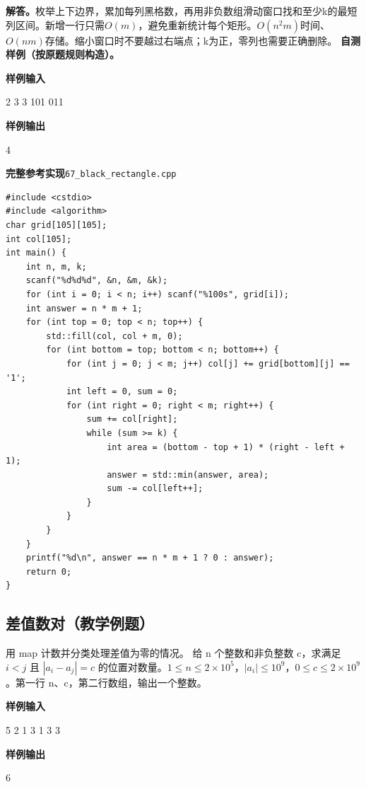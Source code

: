 \documentclass[UTF8,11pt,a4paper,fontset=none]{ctexart}
\begin{document}
\noindent\textbf{解答。}枚举上下边界，累加每列黑格数，再用非负数组滑动窗口找和至少k的最短列区间。新增一行只需$O(m)$，避免重新统计每个矩形。$O(n^2m)$时间、$O(nm)$存储。缩小窗口时不要越过右端点；k为正，零列也需要正确删除。
\textbf{自测样例（按原题规则构造）。}
\begin{tcolorbox}[samplebox,title={输入输出样例}]
\textbf{样例输入}
\begin{Sample}
2 3 3
101
011
\end{Sample}
\tcblower
\textbf{样例输出}
\begin{Sample}
4
\end{Sample}
\end{tcolorbox}
\par\noindent\begin{minipage}{\linewidth}
\textbf{完整参考实现}\quad\texttt{67\_black\_rectangle.cpp}
\begin{lstlisting}
#include <cstdio>
#include <algorithm>
char grid[105][105];
int col[105];
int main() {
    int n, m, k;
    scanf("%d%d%d", &n, &m, &k);
    for (int i = 0; i < n; i++) scanf("%100s", grid[i]);
    int answer = n * m + 1;
    for (int top = 0; top < n; top++) {
        std::fill(col, col + m, 0);
        for (int bottom = top; bottom < n; bottom++) {
            for (int j = 0; j < m; j++) col[j] += grid[bottom][j] == '1';
            int left = 0, sum = 0;
            for (int right = 0; right < m; right++) {
                sum += col[right];
                while (sum >= k) {
                    int area = (bottom - top + 1) * (right - left + 1);
                    answer = std::min(answer, area);
                    sum -= col[left++];
                }
            }
        }
    }
    printf("%d\n", answer == n * m + 1 ? 0 : answer);
    return 0;
}
\end{lstlisting}
\end{minipage}\par


\subsection{差值数对（教学例题）}
用 map 计数并分类处理差值为零的情况。
给 n 个整数和非负整数 c，求满足 $i<j$ 且 $|a_i-a_j|=c$ 的位置对数量。$1\le n\le2\times10^5$，$|a_i|\le10^9$，$0\le c\le2\times10^9$。第一行 n、c，第二行数组，输出一个整数。
\begin{tcolorbox}[samplebox,title={输入输出样例}]
\textbf{样例输入}
\begin{Sample}
5 2
1 3 1 3 3
\end{Sample}
\tcblower
\textbf{样例输出}
\begin{Sample}
6
\end{Sample}
\end{tcolorbox}
\end{document}
